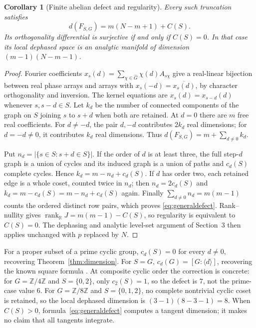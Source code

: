 \documentclass[11pt]{article}
\newtheorem{corollary}[theorem]{Corollary}
\newcommand{\R}{\mathbb R}
\newcommand{\Z}{\mathbb Z}
\begin{document}
\begin{corollary}[Finite abelian defect and regularity]\label{cor:abelian}
Every such truncation satisfies
\begin{equation}\label{eq:generaldefect}
d(F_{S,G})=m(N-m+1)+C(S).
\end{equation}
Its orthogonality differential is surjective if and only if $C(S)=0$.
In that case its local dephased space is an analytic manifold of
dimension $(m-1)(N-m-1)$.
\end{corollary}
\begin{proof}
Fourier coefficients $x_s(d)=\sum_{\chi\in\widehat G}\chi(d)A_{s\chi}$
give a real-linear bijection between real phase arrays and arrays with
$x_s(-d)=\overline{x_s(d)}$, by character orthogonality and inversion.
The kernel equations are $x_s(d)=x_{s-d}(d)$ whenever $s,s-d\in S$.
Let $k_d$ be the number of connected components of the graph on $S$
joining $s$ to $s+d$ when both are retained. At $d=0$ there are $m$
free real coefficients. For $d\ne-d$, the pair $d,-d$ contributes
$2k_d$ real dimensions; for $d=-d\ne0$, it contributes $k_d$ real
dimensions. Thus $d(F_{S,G})=m+\sum_{d\ne0}k_d$.

Put $n_d=|\{s\in S:s+d\in S\}|$. If the order of $d$ is at least
three, the full step-$d$ graph is a union of cycles and its induced graph
is a union of paths and $c_d(S)$ complete cycles. Hence
$k_d=m-n_d+c_d(S)$. If $d$ has order two, each retained edge is a
whole coset, counted twice in $n_d$; then $n_d=2c_d(S)$ and
$k_d=m-c_d(S)=m-n_d+c_d(S)$ again.
Finally $\sum_{d\ne0}n_d=m(m-1)$ counts the ordered distinct row pairs,
which proves \eqref{eq:generaldefect}. Rank--nullity gives
$\operatorname{rank}_{\R}J=m(m-1)-C(S)$, so regularity is equivalent
to $C(S)=0$. The dephasing and analytic level-set argument of Section~3
then applies unchanged with $p$ replaced by $N$.
\end{proof}

For a proper subset of a prime cyclic group, $c_d(S)=0$ for every
$d\ne0$, recovering Theorem~\ref{thm:dimension}.
For $S=G$, $c_d(G)=[G:\langle d\rangle]$, recovering the known
square formula \cite[Theorem~4.2]{Defect}.
At composite cyclic order the correction is concrete: for
$G=\Z/4\Z$ and $S=\{0,2\}$, only $c_2(S)=1$, so the defect is $7$,
not the prime-case value $6$. For $G=\Z/8\Z$ and $S=\{0,1,2\}$,
no complete nontrivial cyclic coset is retained, so the local dephased
dimension is $(3-1)(8-3-1)=8$.
When $C(S)>0$, formula~\eqref{eq:generaldefect} computes a tangent
dimension; it makes no claim that all tangents integrate.
\end{document}
